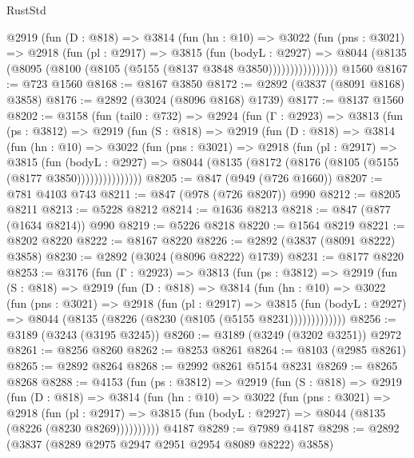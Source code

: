 \begin{lexlean}{RustStd}
\begin{coremodule}
            @2919
              (fun (D : @818) =>
              @3814
                (fun (hn : @10) =>
                @3022
                  (fun (pns : @3021) =>
                  @2918
                    (fun (pl : @2917) =>
                    @3815
                      (fun (bodyL : @2927) =>
                      @8044 (@8135 (@8095 (@8100 (@8105 (@5155 (@8137 @3848 @3850))))))))))))))))
    @1560
@8167 := @723 @1560
@8168 := @8167 @3850
@8172 := @2892 (@3837 (@8091 @8168) @3858)
@8176 := @2892 (@3024 (@8096 @8168) @1739)
@8177 := @8137 @1560
@8202 := @3158
    (fun (tail0 : @732) =>
    @2924
      (fun (Γ : @2923) =>
      @3813
        (fun (ps : @3812) =>
        @2919
          (fun (S : @818) =>
          @2919
            (fun (D : @818) =>
            @3814
              (fun (hn : @10) =>
              @3022
                (fun (pns : @3021) =>
                @2918
                  (fun (pl : @2917) =>
                  @3815
                    (fun (bodyL : @2927) =>
                    @8044 (@8135 (@8172 (@8176 (@8105 (@5155 (@8177 @3850)))))))))))))))
@8205 := @847 (@949 (@726 @1660))
@8207 := @781 @4103 @743
@8211 := @847 (@978 (@726 @8207)) @990
@8212 := @8205 @8211
@8213 := @5228 @8212
@8214 := @1636 @8213
@8218 := @847 (@877 (@1634 @8214)) @990
@8219 := @5226 @8218
@8220 := @1564 @8219
@8221 := @8202 @8220
@8222 := @8167 @8220
@8226 := @2892 (@3837 (@8091 @8222) @3858)
@8230 := @2892 (@3024 (@8096 @8222) @1739)
@8231 := @8177 @8220
@8253 := @3176
    (fun (Γ : @2923) =>
    @3813
      (fun (ps : @3812) =>
      @2919
        (fun (S : @818) =>
        @2919
          (fun (D : @818) =>
          @3814
            (fun (hn : @10) =>
            @3022
              (fun (pns : @3021) =>
              @2918
                (fun (pl : @2917) =>
                @3815
                  (fun (bodyL : @2927) =>
                  @8044 (@8135 (@8226 (@8230 (@8105 (@5155 @8231)))))))))))))
@8256 := @3189 (@3243 (@3195 @3245))
@8260 := @3189 (@3249 (@3202 @3251)) @2972
@8261 := @8256 @8260
@8262 := @8253 @8261
@8264 := @8103 (@2985 @8261)
@8265 := @2892 @8264
@8268 := @2992 @8261 @5154 @8231
@8269 := @8265 @8268
@8288 := @4153
    (fun (ps : @3812) =>
    @2919
      (fun (S : @818) =>
      @2919
        (fun (D : @818) =>
        @3814
          (fun (hn : @10) =>
          @3022
            (fun (pns : @3021) =>
            @2918
              (fun (pl : @2917) =>
              @3815 (fun (bodyL : @2927) => @8044 (@8135 (@8226 (@8230 @8269))))))))))
    @4187
@8289 := @7989 @4187
@8298 := @2892 (@3837 (@8289 @2975 @2947 @2951 @2954 @8089 @8222) @3858)

\end{coremodule}
\end{lexlean}
